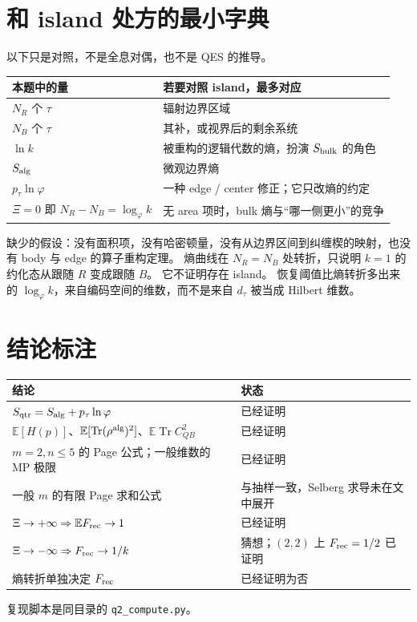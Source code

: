 \documentclass[11pt]{ctexart}
\theoremstyle{definition}
\theoremstyle{remark}
\newcommand{\E}{\mathbb E}
\newcommand{\Tr}{\operatorname{Tr}}
\newcommand{\ph}{\varphi}
\begin{document}
\section{和 island 处方的最小字典}
以下只是对照，不是全息对偶，也不是 QES 的推导。

\begin{center}
\begin{tabular}{@{}ll@{}}
\toprule
本题中的量 & 若要对照 island，最多对应 \\
\midrule
$N_R$ 个 $\tau$ & 辐射边界区域 \\
$N_B$ 个 $\tau$ & 其补，或视界后的剩余系统 \\
$\ln k$ & 被重构的逻辑代数的熵，扮演 $S_{\rm bulk}$ 的角色 \\
$S_{\rm alg}$ & 微观边界熵 \\
$p_\tau\ln\ph$ & 一种 edge / center 修正；它只改熵的约定 \\
$\Xi=0$ 即 $N_R-N_B=\log_{\ph}k$ & 无 area 项时，bulk 熵与“哪一侧更小”的竞争 \\
\bottomrule
\end{tabular}
\end{center}

缺少的假设：没有面积项，没有哈密顿量，没有从边界区间到纠缠楔的映射，也没有 body 与 edge 的算子重构定理。
熵曲线在 $N_R=N_B$ 处转折，只说明 $k=1$ 的约化态从跟随 $R$ 变成跟随 $B$。
它不证明存在 island。
恢复阈值比熵转折多出来的 $\log_{\ph}k$，来自编码空间的维数，而不是来自 $d_\tau$ 被当成 Hilbert 维数。

\section{结论标注}
\begin{center}
\begin{tabular}{@{}ll@{}}
\toprule
结论 & 状态 \\
\midrule
$S_{\rm qtr}=S_{\rm alg}+p_\tau\ln\ph$ & 已经证明 \\
$\E[H(p)]$、$\E[\Tr(\rho^{\rm alg})^2]$、$\E\Tr C_{QB}^2$ & 已经证明 \\
$m=2,n\le 5$ 的 Page 公式；一般维数的 MP 极限 & 已经证明 \\
一般 $m$ 的有限 Page 求和公式 & 与抽样一致，Selberg 求导未在文中展开 \\
$\Xi\to+\infty\Rightarrow\E F_{\rm rec}\to 1$ & 已经证明 \\
$\Xi\to-\infty\Rightarrow F_{\rm rec}\to 1/k$ & 猜想；$(2,2)$ 上 $F_{\rm rec}=1/2$ 已证明 \\
熵转折单独决定 $F_{\rm rec}$ & 已经证明为否 \\
\bottomrule
\end{tabular}
\end{center}

复现脚本是同目录的 \texttt{q2\_compute.py}。
\end{document}
